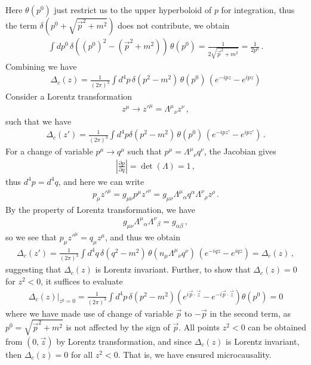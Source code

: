 \documentclass[11pt, onesided]{book}
\theoremstyle{break}
\theoremstyle{break}
\newcommand{\pd}{\partial}
\begin{document}
Here $\theta(p^0)$ just restrict us to the upper hyperboloid of $p$ for integration, thus the term $\delta(p^0+\sqrt{\vec{p}^2 + m^2})$ does not contribute, we obtain
\begin{align*}
\int dp^0 \, \delta((p^0)^2 - (\vec{p}^2 + m^2)) \,\theta(p^0) = \frac{1}{2\sqrt{\vec{p}^2 + m^2}} = \frac{1}{2p^0} \,.
\end{align*}
Combining we have
\begin{align*}
\Delta_c(z) = \frac{1}{(2\pi)^3}\int d^4p\, \delta(p^2 - m^2)\, \theta(p^0)\,\left(e^{-ipz} - e^{ipz} \right)
\end{align*}
Consider a Lorentz transformation 
\begin{align*}
z^\mu \to {z'}^\mu = \Lambda^\mu{}_\nu z^\nu\,,
\end{align*}
such that we have
\begin{align*}
\Delta_c(z') = \frac{1}{(2\pi)^3}\int d^4p \delta(p^2 - m^2)\, \theta(p^0)\,\left(e^{-ipz'} - e^{ipz'} \right)\,.
\end{align*}
For a change of variable $p^\mu \to q^\mu$ such that $p^\mu = \Lambda^\mu{}_\nu q^\nu$, the Jacobian gives
\begin{align*}
\left|\frac{\pd p}{\pd q}\right| = \det(\Lambda) = 1\,,
\end{align*}
thus $d^4p = d^4 q$, and here we can write
\begin{align*}
p_\mu {z'}^\mu = g_{\mu\nu} p^\mu {z'}^\nu = g_{\mu\nu} \Lambda^\mu{}_\alpha q^\alpha \Lambda^\nu{}_\rho z^\rho\,.
\end{align*}
By the property of Lorentz transformation, we have
\begin{align*}
g_{\mu\nu}\Lambda^\mu{}_\alpha \Lambda^\nu{}_\beta = g_{\alpha\beta}\,,
\end{align*}
so we see that $p_\mu {z'}^\mu = q_\mu z^\mu$, and thus we obtain
\begin{align*}
\Delta_c(z') = \frac{1}{(2\pi)^3}\int d^4q\, \delta(q^2 - m^2) \,\theta(n_\mu \Lambda^\mu{}_{\nu}q^\nu)\,\left(e^{-iqz} - e^{iqz} \right) = \Delta_c(z)\,,
\end{align*}
suggesting that $\Delta_c(z)$ is Lorentz invariant. Further, to show that $\Delta_c(z) = 0$ for $z^2 < 0$, it suffices to evaluate
\begin{align*}
\Delta_c(z)|_{z^0 = 0} = \frac{1}{(2\pi)^3}\int d^4 p\, \delta(p^2 - m^2) \left( e^{i\vec{p}\cdot \vec{z}} - e^{-i \vec{p}\cdot \vec{z}}\right) \theta(p^0) = 0
\end{align*}
where we have made use of change of variable $\vec{p}$ to $-\vec{p}$ in the second term, as $p^0 = \sqrt{\vec{p}^2 + m^2}$ is not affected by the sign of $\vec{p}$. All points $z^2<0$ can be obtained from $(0,\vec{z})$ by Lorentz transformation, and since $\Delta_c(z)$ is Lorentz invariant, then $\Delta_c(z) = 0$ for all $z^2 <0$. That is, we have ensured microcausality.\\
\end{document}
